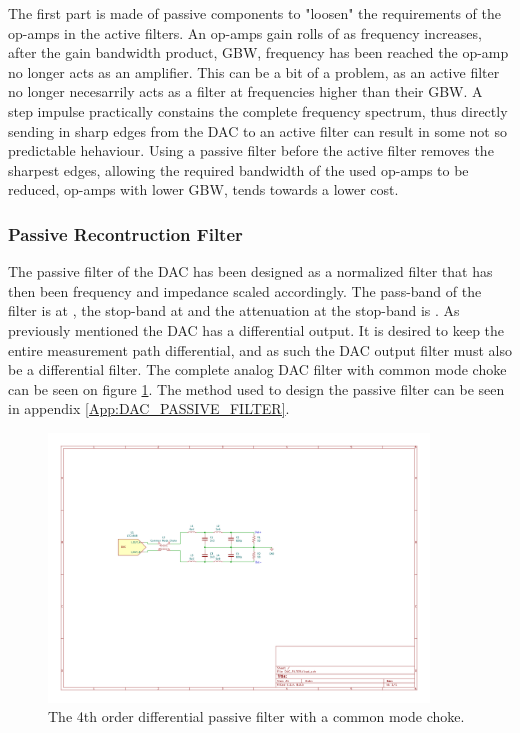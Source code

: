 The first part is made of passive components to "loosen" the requirements of the op-amps in the active filters. An op-amps gain rolls of as frequency increases, after the gain bandwidth product, GBW, frequency has been reached the op-amp no longer acts as an amplifier. This can be a bit of a problem, as an active filter no longer necesarrily acts as a filter at frequencies higher than their GBW. A step impulse practically constains the complete frequency spectrum, thus directly sending in sharp edges from the DAC to an active filter can result in some not so predictable hehaviour. Using a passive filter before the active filter removes the sharpest edges, allowing the required bandwidth of the used op-amps to be reduced, op-amps with lower GBW, tends towards a lower cost.

\subsubsection{Passive Recontruction Filter}
The passive filter of the DAC has been designed as a normalized filter that has then been frequency and impedance scaled accordingly. The pass-band of the filter is at , the stop-band at  and the attenuation at the stop-band is . As previously mentioned the DAC has a differential output. It is desired to keep the entire measurement path differential, and as such the DAC output filter must also be a differential filter. The complete analog DAC filter with common mode choke can be seen on figure \ref{fig_7_1_1_DAC_PASSIVE}. The method used to design the passive filter can be seen in appendix \ref{App:DAC_PASSIVE_FILTER}.

\begin{figure}[H]
    \centering
    \includegraphics[clip, trim=150 300 250 200, width=0.9\textwidth]{Sections/7_SystemDesign/Figures/7_1_1_DAC_PASSIVE_FILTER.pdf}
    \caption{The 4th order differential passive filter with a common mode choke.}
    \label{fig_7_1_1_DAC_PASSIVE}
\end{figure}

